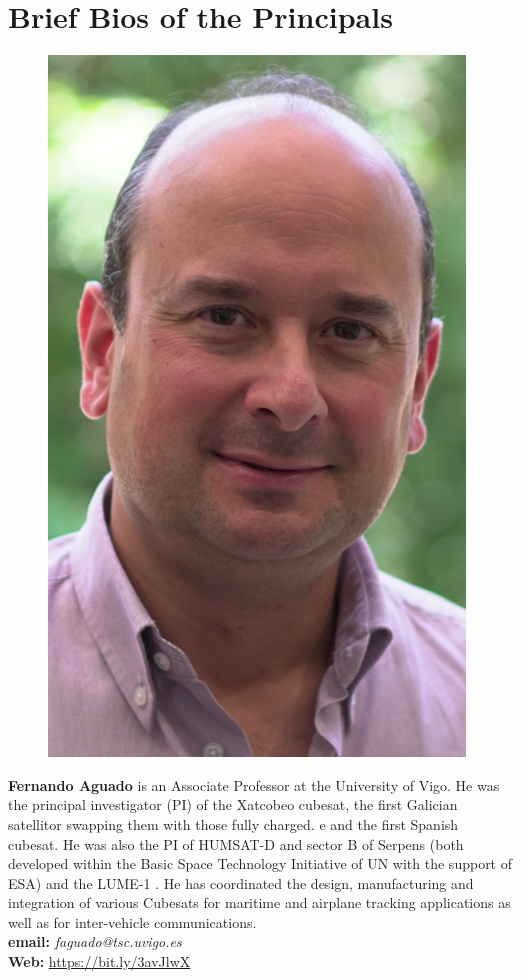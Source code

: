 \section{Brief Bios of the Principals}

\parbox{5.0in}{
\begin{figure} %
    \vspace{-\intextsep}
    \hspace*{-.15\columnsep}\includegraphics[scale=0.3]{fig/Faguado.jpg}
\end{figure}
\textbf{Fernando Aguado} is an Associate Professor at the University
of Vigo. He was the principal investigator (PI) of the Xatcobeo
cubesat, the first Galician satellitor swapping
them with those fully charged. e and the first Spanish
cubesat. He was also the PI of HUMSAT-D and sector B of Serpens (both
developed within the Basic Space Technology Initiative of UN with the
support of ESA) and the LUME-1 \smle. He has coordinated the design,
manufacturing and integration of various Cubesats for maritime and
airplane tracking applications as well as for inter-vehicle
communications. 
\\
\textbf{email: }\emph{faguado@tsc.uvigo.es} \\
\textbf{Web: }\url{https://bit.ly/3avJlwX}\\
}

